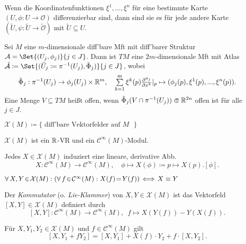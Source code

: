 \documentclass{cheat-sheet}
\renewcommand{\O}{\mathcal{O}} %
\newcommand{\A}{\mathcal{A}} %
\newcommand{\Cont}{\mathcal{C}} %
\newcommand{\VF}{\mathcal{X}} %
\begin{document}
\begin{lem}
  Wenn die Koordinatenfunktionen $\xi^1, \ldots, \xi^n$ für eine bestimmte Karte $(U, \phi : U \to \O)$ differenzierbar sind, dann sind sie es für jede andere Karte $(\tilde{U}, \psi : \tilde{U} \to \tilde{\O})$ mit $\tilde{U} \subseteq U$.
\end{lem}

\begin{defn}
  Sei $M$ eine $m$-dimensionale diff'bare Mft mit diff'barer Struktur $\A = \Set{(U_j, \phi_j)}{j \in J}$. Dann ist $TM$ eine $2m$-dimensionale Mft mit Atlas $\tilde{\A} \coloneqq \Set{(\tilde{U}_j \coloneqq \pi^{-1}(U_j), \tilde{\Phi}_j)}{j \in J}$, wobei
  \[
    \tilde{\Phi}_j : \pi^{-1}(U_j) \to \phi_j(U_j) \times \R^m, \quad
    \sum_{k=1}^m \xi^k(p) \tfrac{\partial^{\phi_j}}{\partial x^k}|_p \mapsto (\phi_j(p), \xi^1(p), \nldots, \xi^n(p)).
  \]
  Eine Menge $V \subseteq TM$ heißt offen, wenn $\tilde{\Phi}_j(V \cap \pi^{-1}(U_j)) \opn \R^{2n}$ offen ist für alle $j \in J$.
\end{defn}

\begin{nota}
  $\VF(M) \coloneqq \{\text{ diff'bare Vektorfelder auf $M$ }\}$
\end{nota}

\begin{bem}
  $\VF(M)$ ist ein $\mathbb{R}$-VR und ein $\Cont^\infty(M)$-Modul.
\end{bem}

\begin{lem}
  Jedes $X \in \VF(M)$ induziert eine lineare, derivative Abb.
  \[
    X : \Cont^\infty(M) \to \Cont^\infty(M), \quad
    \phi \mapsto X(\phi) \coloneqq p \mapsto X(p) . [\phi].
  \]
\end{lem}

\begin{lem}
  $\fa{X, Y \!\in\! \VF(M)\!}\! (\fa{f \!\in\! \Cont^\infty(M)\!}\! X(f) \!=\! Y(f)) \!\iff\! X \equiv Y$
\end{lem}

\begin{defn}
  Der \emph{Kommutator} (o. \emph{Lie-Klammer}) von $X, Y \in \VF(M)$ ist das Vektorfeld $[X, Y] \in \VF(M)$ definiert durch
  \[
    [X, Y] : \Cont^\infty(M) \to \Cont^\infty(M), \enspace
    f \mapsto X(Y(f)) - Y(X(f)).
  \]
\end{defn}

\begin{satz}
  Für $X, Y_1, Y_2 \in \VF(M)$ und $f \in \Cont^\infty(M)$ gilt
  \[ [X, Y_1 + f Y_2] = [X, Y_1] + X(f) \cdot Y_2 + f \cdot [X, Y_2]. \]
\end{satz}
\end{document}
